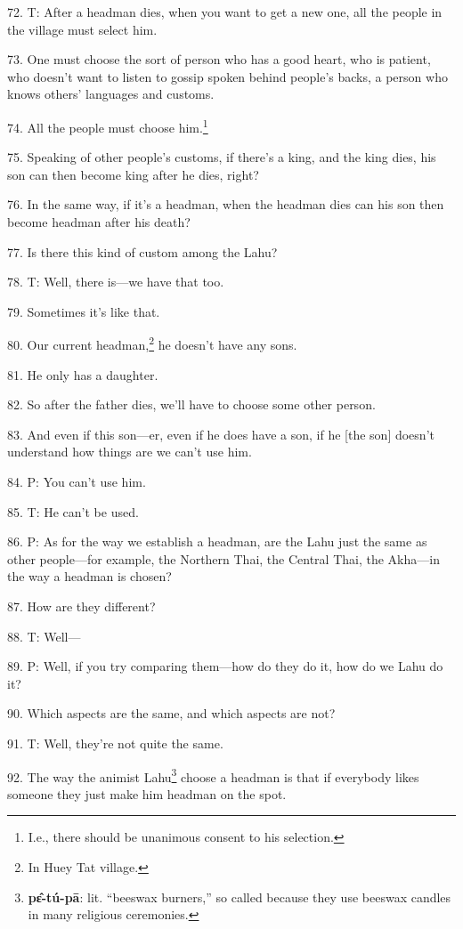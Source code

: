 72. T: After a headman dies, when you want to get a new one, all the people in
the village must select him.

73. One must choose the sort of person who has a good heart, who is patient, who
doesn't want to listen to gossip spoken behind people's backs, a person who knows
others' languages and customs.

74. All the people must choose him.\footnote{I.e., there should be unanimous consent to his selection.}

75. Speaking of other people's customs, if there's a king, and the king dies, his
son can then become king after he dies, right?

76. In the same way, if it's a headman, when the headman dies can his son then
become headman after his death?

77. Is there this kind of custom among the Lahu?

78. T: Well, there is---we have that too.

79. Sometimes it's like that.

80. Our current headman,\footnote{In Huey Tat village.} he doesn't have any sons.

81. He only has a daughter.

82. So after the father dies, we'll have to choose some other person.

83. And even if this son---er, even if he does have a son, if he [the son] doesn't
understand how things are we can't use him.

84. P: You can't use him.

85. T: He can't be used.

86. P: As for the way we establish a headman, are the Lahu just the same as other
people---for example, the Northern Thai, the Central Thai, the Akha---in the way
a headman is chosen?

87. How are they different?

88. T: Well---

89. P: Well, if you try comparing them---how do they do it, how do we Lahu do it?

90. Which aspects are the same, and which aspects are not?

91. T: Well, they're not quite the same.

92. The way the animist Lahu\footnote{\textbf{pɛ̂-tú-pā}: lit. ``beeswax burners,'' so called because they use beeswax candles in many religious ceremonies.} choose a headman is that if everybody likes someone
they just make him headman on the spot.

